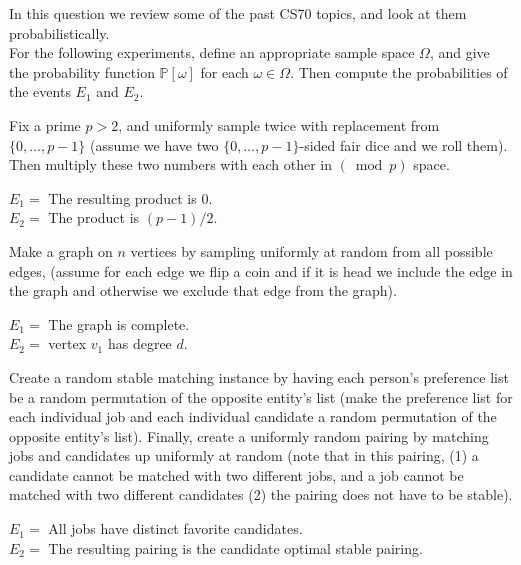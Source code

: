 \documentclass[11pt]{article}
\begin{document}
In this question we review some of the past CS70 topics, and look at them 
probabilistically.
\\ 
For the following experiments, define an appropriate sample space $\Omega$, and
give the probability function $\mathbb P[\omega]$ for each $\omega \in \Omega$. 
Then compute the probabilities of the events $E_1$ and $E_2$. 
\\

\begin{Parts}
    \Part Fix a prime $p>2$, and uniformly sample twice with replacement from
    $\{0, \dots, p-1\}$ (assume we have two $\{0, \dots, p-1\}$-sided fair dice 
    and we roll them). Then multiply these two numbers with each other in
    $(\bmod{p})$ space.\\
    \begin{center}
    $E_1 =$ The resulting product is $0$.\\
    $E_2 =$ The product is $(p-1)/2$.
    \end{center}

    \Part Make a graph on $n$ vertices by sampling uniformly at random from all 
    possible edges, (assume for each edge we flip a coin and if it is head we 
    include the edge in the graph and otherwise we exclude that edge from the 
    graph).
    \\
    \begin{center}
    $E_1 =$ The graph is complete.\\
    $E_2 =$ vertex $v_1$ has degree $d$.
    \end{center}

    \Part Create a random stable matching instance by having each person's
    preference list be a random permutation of the opposite entity's list (make 
    the preference list for each individual job and each individual candidate a 
    random permutation of the opposite entity's list). Finally, create a uniformly 
    random pairing by matching jobs and candidates up uniformly at random (note 
    that in this pairing, (1) a candidate cannot be matched with two different 
    jobs, and a job cannot be matched with two different candidates (2) the 
    pairing does not have to be stable).
    \\
    \begin{center}
     $E_1 =$ All jobs have distinct favorite candidates.\\
     $E_2 =$ The resulting pairing is the candidate optimal stable pairing.
    \end{center}

\end{Parts}
\end{document}
